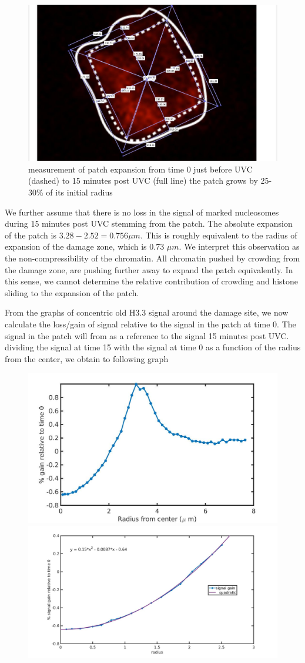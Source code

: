 \documentclass[12pt]{report}
\begin{document}
\begin{figure}[H]
\centering
\includegraphics[width=0.7\linewidth, height=0.3\textheight]{Images/patchExpansion/patchExpansionMeasurement}
\caption{\tiny{measurement of patch expansion from time 0  just before UVC (dashed) to 15 minutes post UVC (full line) the patch grows by 25-30\% of its initial radius}}
\label{fig:patchExpansionMeasurement}
\end{figure}


We further assume that there is no loss in the signal of marked nucleosomes during 15 minutes post UVC stemming from the patch. The absolute expansion of the patch is $3.28-2.52=0.756\mu m$. This is roughly equivalent to the radius of expansion of the damage zone, which is 0.73 $\mu m$. We interpret this observation as the non-compressibility of the chromatin. All chromatin pushed by crowding from the damage zone, are pushing further away to expand the patch equivalently. In this sense, we cannot determine the relative contribution of crowding and histone sliding to the expansion of the patch. 

From the graphs of concentric old H3.3 signal around the damage site, we now calculate the loss/gain of signal relative to the signal in the patch at time 0. The signal in the patch will from as a reference to the signal 15 minutes post UVC. dividing the signal at time 15 with the signal at time 0 as a function of the radius from the center, we obtain to following graph

\begin{figure}[H]
\includegraphics[width=0.5\linewidth, height=0.3\textheight]{Images/patchExpansion/relativeGainNucleosomesConcentric}
\includegraphics[width=0.5\linewidth, height=0.3\textheight]{Images/patchExpansion/nucleosomeSignalGainConcentricFit}
\caption{}
\label{fig:relativeGainNucleosomesConcentric}
\end{figure}
\end{document}
